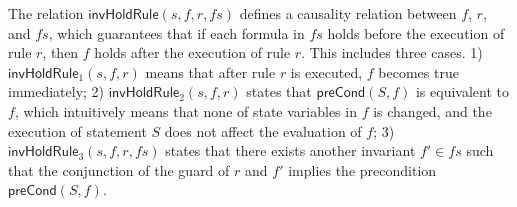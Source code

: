 \documentclass[final]{IEEEtran}
\newlength{\fminilength}
\newenvironment{fmini}[1][\linewidth]
  {\setlength{\fminilength}{#1\fboxsep-2\fboxrule}%
   \vspace{2ex}\noindent\begin{lrbox}{\fminibox}\begin{minipage}{\fminilength}%
   \mbox{ }\hfill\vspace{-2.5ex}}%
  {\end{minipage}\end{lrbox}\vspace{1ex}\hspace{0ex}%
   \framebox{\usebox{\fminibox}}}
\newenvironment{specification}
{\noindent\scriptsize
\tt\begin{fmini}\begin{tabbing}X\=X12345\=XXXX\=XXXX\=XXXX\=XXXX\=XXXX
\=\+\kill} {\end{tabbing}\normalfont\end{fmini}}
\begin{document}









The relation $\mathsf{invHoldRule}(s, f,r,fs)$ defines a causality relation
between $f$, $r$, and $fs$, which guarantees that if each formula in $fs$ holds
before the execution of rule $r$, then $f$ holds after the execution of rule $r$. This includes three cases. 1) $\mathsf{invHoldRule}_1(s,f, r)$ means that after rule $r$ is executed, $f$ becomes true immediately;   2) $\mathsf{invHoldRule}_2(s,f, r)$ states that $\mathsf{preCond}(S,f)$ is equivalent to $f$, which intuitively means that none of state variables in $f$ is changed, and the execution of statement $S$ does not affect the evaluation of $f$;
 3) $\mathsf{invHoldRule}_3(s,f, r,fs)$ states that there exists another invariant $f' \in fs$ such that
  the conjunction of the guard of $r$ and $f'$ implies the precondition  $\mathsf{preCond}(S,f)$.
\end{document}
